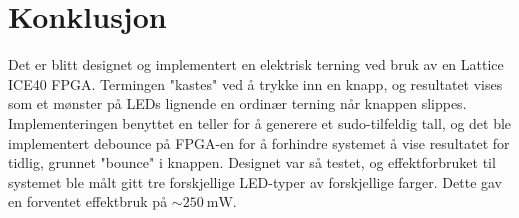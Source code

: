 \section{Konklusjon}
\label{konklusjon}

Det er blitt designet og implementert en elektrisk terning ved bruk av en Lattice ICE40 FPGA.
Termingen "kastes" ved å trykke inn en knapp, og resultatet vises som et mønster på 
LEDs lignende en ordinær terning når knappen slippes. Implementeringen benyttet en teller for å 
generere et sudo-tilfeldig tall, og det ble implementert debounce på FPGA-en for å forhindre 
systemet å vise resultatet for tidlig, grunnet "bounce" i knappen. Designet var så testet, og 
effektforbruket til systemet ble målt gitt tre forskjellige LED-typer av forskjellige farger. 
Dette gav en forventet effektbruk på $\sim\SI{250}{\milli\watt}$.
